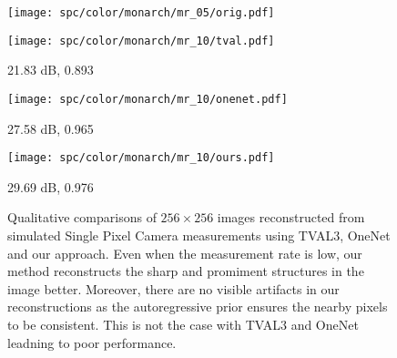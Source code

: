 \documentclass[journal,twoside]{IEEEtran}
\begin{document}
\begin{figure*}[t]
\begin{minipage}{.98\textwidth}
\begin{minipage}{.20\textwidth}
\vspace{-0.35cm}
\texttt{[image: spc/color/monarch/mr\_05/orig.pdf]}  
\end{minipage}\hspace{0.1cm}
\begin{minipage}{.20\textwidth}
\vspace{0.1cm}
\texttt{[image: spc/color/monarch/mr\_10/tval.pdf]}  
\centerline{ 21.83 dB, 0.893}
\end{minipage}\hspace{0.1cm}
\begin{minipage}{.20\textwidth}
\vspace{0.1cm}
\texttt{[image: spc/color/monarch/mr\_10/onenet.pdf]}  
\centerline{27.58 dB, 0.965}
\end{minipage}\hspace{0.1cm}
\begin{minipage}{.20\textwidth}
\vspace{0.1cm}
\texttt{[image: spc/color/monarch/mr\_10/ours.pdf]}  
\centerline{29.69 dB, 0.976}
\end{minipage}
\centerline{}
\centerline{}
\end{minipage}
\caption{Qualitative comparisons of $256 \times 256$ images reconstructed from simulated Single Pixel Camera measurements using TVAL3, OneNet and our approach. Even when the measurement rate is low, our method reconstructs the sharp and promiment structures in the image better. Moreover, there are no visible artifacts in our reconstructions as the autoregressive prior ensures the nearby pixels to be consistent. This is not the case with TVAL3 and OneNet leadning to poor performance.}
\label{fig:spc_color}
\end{figure*}
\end{document}
